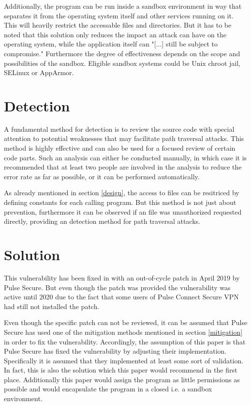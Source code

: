Additionally, the program can be run inside a sandbox environment in way that separates it from the operating system itself and other services running on it. This will heavily restrict the accessable files and directories. But it has to be noted that this solution only reduces the impact an attack can have on the operating system, while the application itself can "[...] still be subject to compromise." \autocite{CWE22-Definition:online} Furthermore the degree of effectiveness depends on the scope and possibilities of the sandbox. Eligible sandbox systems could be Unix chroot jail, SELinux or AppArmor. \autocite{CWE22-Definition:online}

\section{Detection}
\label{detection}
A fundamental method for detection is to review the source code with special attention to potential weaknesses that may facilitate path traversal attacks. This method is highly effective and can also be used for a focused review of certain code parts. Such an analysis can either be conducted manually, in which case it is recommended that at least two people are involved in the analysis to reduce the error rate as far as possible, or it can be performed automatically.

As already mentioned in section \ref{design}, the access to files can be resitriced by defining constants for each calling program. But this method is not just about prevention, furthermore it can be observed if an file was unauthorized requested directly, providing an detection method for path traversal attacks.

\section{Solution}
\label{solution}
This vulnerability has been fixed in with an out-of-cycle patch in April 2019 by Pulse Secure. But even though the patch was provided the vulnerability was active until 2020 due to the fact that some users of Pulse Connect Secure VPN had still not installed the patch.

Even though the specific patch can not be reviewed, it can be assumed that Pulse Secure has used one of the mitigation methods mentioned in section \ref{mitigation} in order to fix the vulnerability. Accordingly, the assumption of this paper is that Pulse Secure has fixed the vulnerability by adjusting their implementation. Specifically it is assumed that they implemented at least some sort of validation. In fact, this is also the solution which this paper would recommend in the first place. Additionally this paper would assign the program as little permissions as possible and would encapsulate the program in a closed i.e. a sandbox environment.